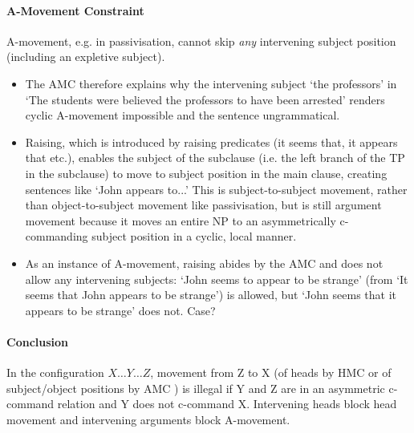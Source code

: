 \documentclass{article}
\begin{document}
\paragraph{A-Movement Constraint} A-movement, e.g. in passivisation, cannot skip \textit{any} intervening subject position (including an expletive subject).
\begin{itemize}
    \item The AMC therefore explains why the intervening subject `the professors' in `The students were believed the professors to have been arrested' renders cyclic A-movement impossible and the sentence ungrammatical.
    \item Raising, which is introduced by raising predicates (it seems that, it appears that etc.), enables the subject of the subclause (i.e. the left branch of the TP in the subclause) to move to subject position in the main clause, creating sentences like `John appears to...' This is subject-to-subject movement, rather than object-to-subject movement like passivisation, but is still argument movement because it moves an entire NP to an asymmetrically c-commanding subject position in a cyclic, local manner.
    \item As an instance of A-movement, raising abides by the AMC and does not allow any intervening subjects: `John seems to appear to be strange' (from `It seems that John appears to be strange') is allowed, but `John seems that it appears to be strange' does not. Case?
\end{itemize}
\paragraph{Conclusion} In the configuration $X \ldots Y \ldots Z$, movement from Z to X (of heads by HMC or of subject/object positions by AMC ) is illegal if Y and Z are in an asymmetric c-command relation and Y does not c-command X. Intervening heads block head movement and intervening arguments block A-movement.
\end{document}
